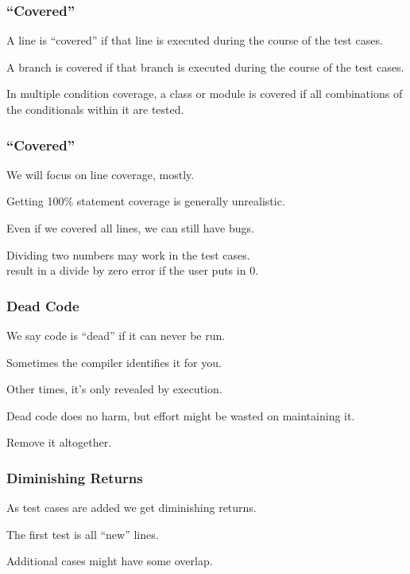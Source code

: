 \begin{frame}
\frametitle{``Covered''}
\begin{changemargin}{1cm}

A line is ``covered'' if that line is executed during the course of the test cases. 

A branch is covered if that branch is executed during the course of the test cases. 

In multiple condition coverage, a class or module is covered if all combinations of the conditionals within it are tested.
\end{changemargin}
\end{frame}


\begin{frame}
\frametitle{``Covered''}
\begin{changemargin}{1cm}
We will focus on line coverage, mostly.


Getting 100\% statement coverage is generally unrealistic.

Even if we covered all lines, we can still have bugs.

Dividing two numbers may work in the test cases. \\
\quad result in a divide by zero error if the user puts in 0. 


\end{changemargin}
\end{frame}

\begin{frame}
\frametitle{Dead Code}
\begin{changemargin}{1cm}
We say code is ``dead'' if it can never be run.

Sometimes the compiler identifies it for you.

Other times, it's only revealed by execution.

Dead code does no harm, but effort might be wasted on maintaining it.

Remove it altogether.

\end{changemargin}
\end{frame}

\begin{frame}
\frametitle{Diminishing Returns}
\begin{changemargin}{1cm}
As test cases are added we get diminishing returns.

The first test is all ``new'' lines.

Additional cases might have some overlap.

\end{changemargin}
\end{frame}

